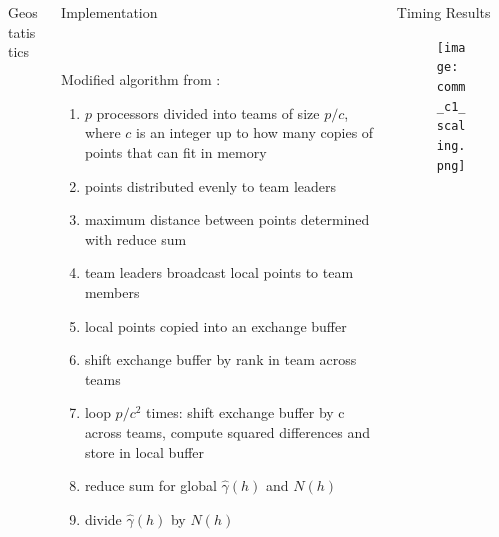 \documentclass[serif,mathserif,final]{beamer}
\begin{document}
\begin{frame}{}
\begin{columns}[t]
\begin{column}{0.32\linewidth}
\begin{block}{Geostatistics}
      \end{block}
  

    \end{column}%

    \begin{column}{0.32\linewidth}

      \begin{block}{Implementation}
	
	~
	
      \begin{flushleft} Modified algorithm from \cite{Koanantakool}:
        \begin{enumerate}
          \item $p$ processors divided into teams of size $p/c$, where $c$ is an integer up to how many copies of points that can fit in memory
          \item points distributed evenly to team leaders
          \item maximum distance between points determined with reduce sum
          \item team leaders broadcast local points to team members
          \item local points copied into an exchange buffer
          \item shift exchange buffer by rank in team across teams
          \item loop $p/c^2$ times: shift exchange buffer by c across teams, compute squared differences and store in local buffer
          \item reduce sum for global $\hat{\gamma}(h)$ and $N(h)$
          \item divide $\hat{\gamma}(h)$ by $N(h)$
        \end{enumerate}
        \end{flushleft}
      \end{block}

    \end{column}%

    \begin{column}{0.32\linewidth}

      \begin{block}{Timing Results}
        \begin{figure}[htbp]
            \centering
            \texttt{[image: comm\_c1\_scaling.png]} %
            \label{fig:plot}
         \end{figure}
      \end{block}


\end{column}
\end{columns}
\end{frame}
\end{document}
